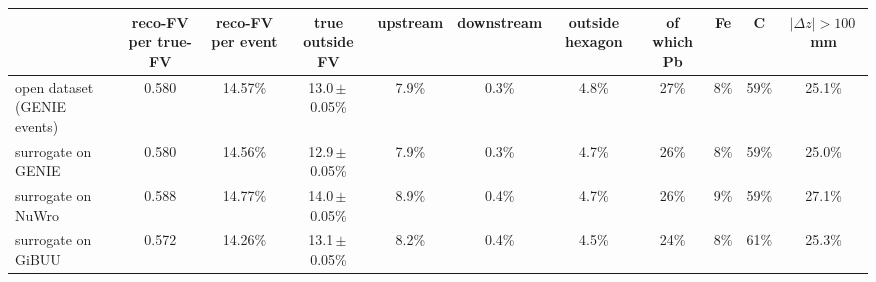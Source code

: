 \begin{tabular}{lcccccccccc}
\toprule
 & reco-FV per true-FV & reco-FV per event & true outside FV & upstream & downstream & outside hexagon & of which Pb & Fe & C & $|\Delta z| > 100$\,mm \\
\midrule
open dataset (GENIE events) & 0.580 & 14.57\% & 13.0\,$\pm$\,0.05\% & 7.9\% & 0.3\% & 4.8\% & 27\% & 8\% & 59\% & 25.1\% \\
surrogate on GENIE & 0.580 & 14.56\% & 12.9\,$\pm$\,0.05\% & 7.9\% & 0.3\% & 4.7\% & 26\% & 8\% & 59\% & 25.0\% \\
surrogate on NuWro & 0.588 & 14.77\% & 14.0\,$\pm$\,0.05\% & 8.9\% & 0.4\% & 4.7\% & 26\% & 9\% & 59\% & 27.1\% \\
surrogate on GiBUU & 0.572 & 14.26\% & 13.1\,$\pm$\,0.05\% & 8.2\% & 0.4\% & 4.5\% & 24\% & 8\% & 61\% & 25.3\% \\
\bottomrule
\end{tabular}
